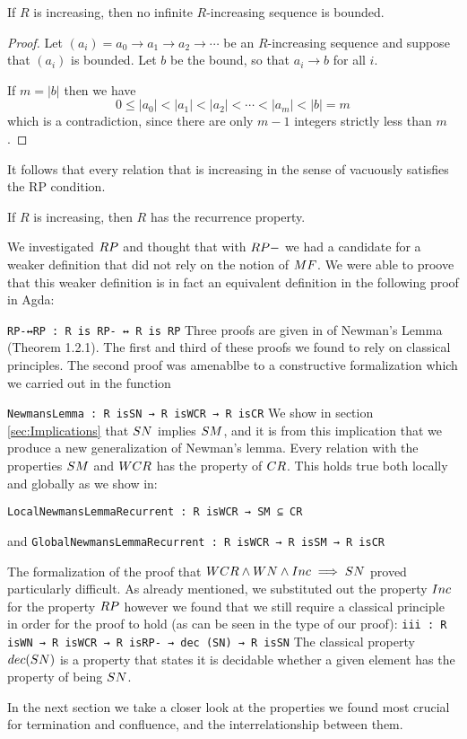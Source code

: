 \begin{proposition}
    If $R$ is increasing, then no infinite $R$-increasing sequence is bounded.
\end{proposition}
\begin{proof}
    Let $(a_i) = a_0 \to a_1 \to a_2 \to \cdots$ be an $R$-increasing sequence
    and suppose that $(a_i)$ is bounded.  Let $b$ be the bound, so that $a_i \to b$ for all $i$.

    If $m = |b|$ then we have
    \[ 0 \le |a_0| < |a_1| < |a_2| < \cdots < |a_m| < |b| = m \]
    which is a contradiction, since there are only $m-1$ integers strictly less than $m$.
\end{proof}
It follows that every relation that is increasing in the sense of \terese
vacuously satisfies the RP condition.

\begin{corollary}
    If $R$ is increasing, then $R$ has the recurrence property.
\end{corollary}

We investigated $\RP$ and thought that with $\RPm$ we had a candidate for a weaker definition that 
did not rely on the notion of $\MF$. We were able to proove that this weaker definition is 
in fact an equivalent definition in the following proof in Agda: 

\verb|RP-↔RP : R is RP- ↔ R is RP| \footnotemark[1]
Three proofs are given in \terese of Newman's Lemma (Theorem 1.2.1). The first and third of 
these proofs we found to rely on classical principles. The second proof was amenablbe to a 
constructive formalization which we carried out in the function 


\verb|NewmansLemma : R isSN → R isWCR → R isCR| \footnotemark[2]
We show in section \ref{sec:Implications} that $\SN$ implies $\SM$, and it is from this implication 
that we produce a new generalization of Newman's lemma. Every relation with the properties 
$\SM$ and $\WCR$ has the property of $\CR$. This holds true both locally and globally as we show in:

\verb|LocalNewmansLemmaRecurrent : R isWCR → SM ⊆ CR| \footnotemark[2]

and \verb|GlobalNewmansLemmaRecurrent : R isWCR → R isSM → R isCR| \footnotemark[2]

The formalization of the proof that $\WCR \land \WN \land \Inc \implies \SN$ proved particularly difficult. 
As already mentioned, we substituted out the property $\Inc$ for the property $\RP$ however 
we found that we still require a classical principle in order for the proof to hold (as can be seen in the type of our proof):
\verb|iii : R isWN → R isWCR → R isRP- → dec (SN) → R isSN| \footnotemark[3] 
The classical property $\decSN$ is a property that states it is decidable whether a given 
element has the property of being $\SN$. 

In the next section we take a closer look at the properties we found most crucial for termination and confluence, and the interrelationship between them.

